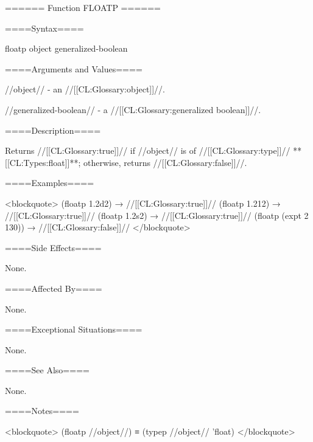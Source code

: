 ====== Function FLOATP ======

====Syntax====

\Defun floatp {object} {generalized-boolean}

====Arguments and Values====

//object// - an //[[CL:Glossary:object]]//.

//generalized-boolean// - a //[[CL:Glossary:generalized boolean]]//.

====Description====

Returns //[[CL:Glossary:true]]// if //object// is of //[[CL:Glossary:type]]// **[[CL:Types:float]]**; otherwise, returns //[[CL:Glossary:false]]//.

====Examples====

<blockquote> (floatp 1.2d2) → //[[CL:Glossary:true]]// (floatp 1.212) → //[[CL:Glossary:true]]// (floatp 1.2s2) → //[[CL:Glossary:true]]// (floatp (expt 2 130)) → //[[CL:Glossary:false]]// </blockquote>

====Side Effects====

None.

====Affected By====

None.

====Exceptional Situations====

None.

====See Also====

None.

====Notes====

<blockquote> (floatp //object//) ≡ (typep //object// 'float) </blockquote>

